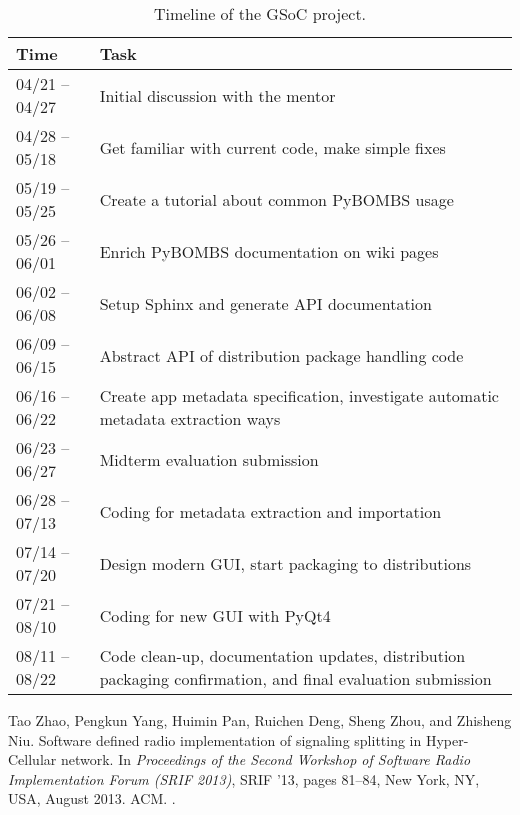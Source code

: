 \documentclass[a4paper]{article}
\begin{document}
\begin{table}[htbp]
  \centering
  \begin{tabular}{lp{}}
    \hline
    Time & Task \\
    \hline
    04/21 -- 04/27 & Initial discussion with the mentor \\
    04/28 -- 05/18 & Get familiar with current code, make simple fixes \\
    05/19 -- 05/25 & Create a tutorial about common PyBOMBS usage\\
    05/26 -- 06/01 & Enrich PyBOMBS documentation on wiki pages \\
    06/02 -- 06/08 & Setup Sphinx and generate API documentation \\
    06/09 -- 06/15 & Abstract API of distribution package handling code \\
    06/16 -- 06/22 & Create app metadata specification, investigate
    automatic metadata extraction ways\\
    06/23 -- 06/27 & Midterm evaluation submission\\
    06/28 -- 07/13 & Coding for metadata extraction and importation \\
    07/14 -- 07/20 & Design modern GUI, start packaging to distributions \\
    07/21 -- 08/10 & Coding for new GUI with PyQt4 \\
    08/11 -- 08/22 & Code clean-up, documentation updates, distribution
    packaging confirmation, and final evaluation submission \\
    \hline
  \end{tabular}
  \caption{Timeline of the GSoC project.}
  \label{tab:timeline}
\end{table}

\begin{thebibliography}{1}

Tao Zhao, Pengkun Yang, Huimin Pan, Ruichen Deng, Sheng Zhou, and Zhisheng Niu.
\newblock Software defined radio implementation of signaling splitting in
  {Hyper-Cellular} network.
\newblock In {\em Proceedings of the Second Workshop of Software Radio
  Implementation Forum (SRIF 2013)}, SRIF '13, pages 81--84, New York, NY, USA,
  August 2013. ACM.
\newblock \href {http://dx.doi.org/10.1145/2491246.2491258}
  {}.

\end{thebibliography}
\end{document}
